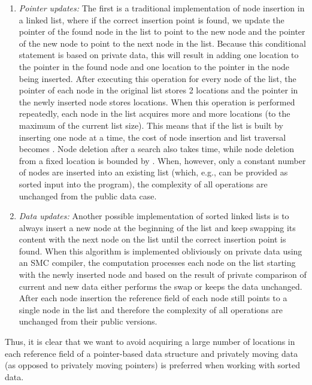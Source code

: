 \documentclass[11pt]{article}
\begin{document}
\begin{enumerate}
\item \emph{Pointer updates:} The first is a traditional implementation of
  node insertion in a linked list, where if the correct insertion point is
  found, we update the pointer of the found node in the list to point to the
  new node and the pointer of the new node to point to the next node in the
  list. Because this conditional statement is based on private data, this
  will result in adding one location to the pointer in the found node and
  one location to the pointer in the node being inserted. After executing
  this operation for every node of the list, the pointer of each node in the
  original list stores 2 locations and the pointer in the newly inserted
  node stores  locations. When this operation is performed repeatedly,
  each node in the list acquires more and more locations (to the maximum of
  the current list size). This means that if the list is built by inserting
  one node at a time, the cost of node insertion and list traversal becomes
  . Node deletion after a search also takes  time, while
  node deletion from a fixed location is bounded by . When, however,
  only a constant number of nodes are inserted into an existing list (which,
  e.g., can be provided as sorted input into the program), the complexity of
  all operations are unchanged from the public data case.

\item \emph{Data updates:} Another possible implementation of sorted linked
  lists is to always insert a new node at the beginning of the list and keep
  swapping its content with the next node on the list until the correct
  insertion point is found. When this algorithm is implemented obliviously
  on private data using an SMC compiler, the computation processes each node
  on the list starting with the newly inserted node and based on the result
  of private comparison of current and new data either performs the swap or
  keeps the data unchanged. After each node insertion the reference field
  of each node still points to a single node in the list and therefore
  the complexity of all operations are unchanged from their public versions.
\end{enumerate}
Thus, it is clear that we want to avoid acquiring a large number of
locations in each reference field of a pointer-based data structure and
privately moving data (as opposed to privately moving pointers) is preferred
when working with sorted data.
\end{document}
